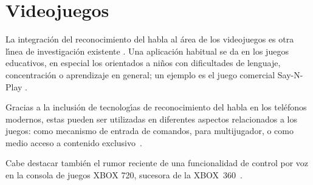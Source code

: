 \section{Videojuegos}
\label{sec:videojuegos}

La integraci\'on del reconocimiento del habla al \'area de los videojuegos es otra l{\'\i}nea de
investigaci\'on existente \cite{SporkaNonSpeech2006, JanickiAutomatic2011}. 
Una aplicaci\'on habitual se da en los juegos educativos, en especial los orientados a ni\~nos 
con dificultades de lenguaje, concentraci\'on o aprendizaje en general; un ejemplo es el juego
comercial Say-N-Play \cite{SayNPlay}.

Gracias a la inclusi\'on de tecnolog{\'\i}as de reconocimiento del habla en los tel\'efonos modernos,
estas pueden ser utilizadas en diferentes aspectos relacionados a los juegos: como mecanismo de entrada 
de comandos, para  multijugador, o como medio acceso a contenido 
\mbox{exclusivo \cite{JoselliMobile2009}}.

Cabe destacar tambi\'en el rumor reciente de una funcionalidad de control por voz en
la consola de juegos XBOX 720, sucesora de la \mbox{XBOX 360 \cite{IgnXbox}}.


